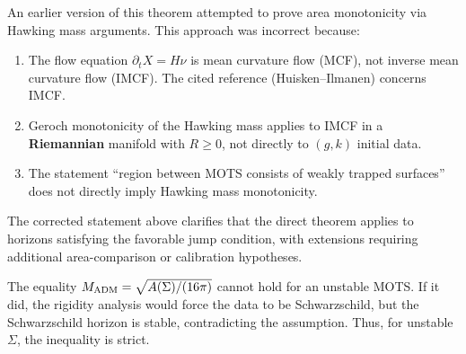 \begin{remark}
An earlier version of this theorem attempted to prove area monotonicity via Hawking mass arguments. This approach was incorrect because:
\begin{enumerate}
    \item The flow equation $\partial_t X = H\nu$ is mean curvature flow (MCF), not inverse mean curvature flow (IMCF). The cited reference (Huisken--Ilmanen) concerns IMCF.
    \item Geroch monotonicity of the Hawking mass applies to IMCF in a \textbf{Riemannian} manifold with $R \ge 0$, not directly to $(g,k)$ initial data.
    \item The statement ``region between MOTS consists of weakly trapped surfaces'' does not directly imply Hawking mass monotonicity.
\end{enumerate}
The corrected statement above clarifies that the direct theorem applies to horizons satisfying the favorable jump condition, with extensions requiring additional area-comparison or calibration hypotheses.
\end{remark}

\begin{remark}
The equality $M_{\mathrm{ADM}} = \sqrt{A(\Sigma)/(16\pi)}$ cannot hold for an unstable MOTS. If it did, the rigidity analysis would force the data to be Schwarzschild, but the Schwarzschild horizon is stable, contradicting the assumption. Thus, for unstable $\Sigma$, the inequality is strict.
\end{remark}

